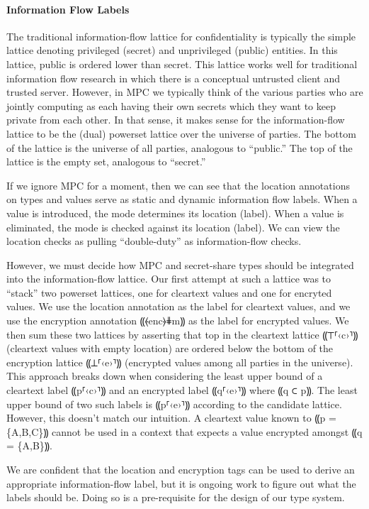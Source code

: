 \paragraph*{Information Flow Labels}

The traditional information-flow lattice for confidentiality is
typically the simple lattice denoting privileged (secret) and
unprivileged (public) entities. In this lattice, public is
ordered lower than secret. This lattice works well for traditional
information flow research in which there is a conceptual untrusted
client and trusted server. However, in MPC we typically think of
the various parties who are jointly computing as each having their
own secrets which they want to keep private from each other. In
that sense, it makes sense for the information-flow lattice to
be the (dual) powerset lattice over the universe of parties. The
bottom of the lattice is the universe of all parties, analogous
to ``public.'' The top of the lattice is the empty set, analogous
to ``secret.''

If we ignore MPC for a moment, then we can see that the location
annotations on types and values serve as static and dynamic information
flow labels. When a value is introduced, the mode determines its location (label).
When a value is eliminated, the mode is checked against its location (label).
We can view the location checks as pulling ``double-duty'' as information-flow
checks.

However, we must decide how MPC and secret-share types should be integrated into
the information-flow lattice. Our first attempt at such a lattice was to ``stack''
two powerset lattices, one for cleartext values and one for encryted values. We
use the location annotation as the label for cleartext values, and we use the
encryption annotation ⸨⦑enc⦒⋕m⸩ as the label for encrypted values. We then
sum these two lattices by asserting that top in the cleartext lattice ⸨⊤⸢‹c›⸣⸩
(cleartext values with empty location) are ordered below the bottom of the
encryption lattice ⸨⊥⸢‹e›⸣⸩ (encrypted values among all parties in the universe).
This approach breaks down when considering the least upper bound of a cleartext
label ⸨p⸢‹c›⸣⸩ and an encrypted label ⸨q⸢‹e›⸣⸩ where ⸨q ⊂ p⸩. The least upper
bound of two such labels is ⸨p⸢‹e›⸣⸩ according to the candidate lattice. However,
this doesn't match our intuition. A cleartext value known to ⸨p = \{A,B,C\}⸩ cannot
be used in a context that expects a value encrypted amongst ⸨q = \{A,B\}⸩.

We are confident that the location and encryption tags can be used to derive an appropriate
information-flow label, but it is ongoing work to figure out what the labels should be. Doing
so is a pre-requisite for the design of our type system.

